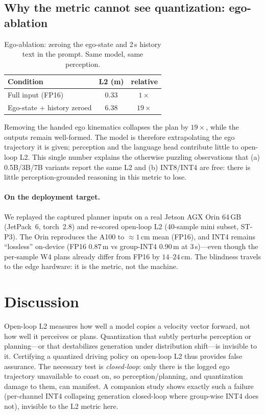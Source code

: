 \documentclass[conference]{IEEEtran}
\begin{document}
\subsection{Why the metric cannot see quantization: ego-ablation}
\begin{table}[t]\centering
\caption{Ego-ablation: zeroing the ego-state and 2\,s history text in the prompt. Same model,
same perception.}
\begin{tabular}{lcc}
\toprule
Condition & L2 (m) & relative \\
\midrule
Full input (FP16)          & 0.33 & $1\times$ \\
Ego-state + history zeroed & 6.38 & $19\times$ \\
\bottomrule
\end{tabular}
\end{table}
Removing the handed ego kinematics collapses the plan by $19\times$, while the outputs remain
well-formed. The model is therefore extrapolating the ego trajectory it is given; perception and
the language head contribute little to open-loop L2. This single number explains the otherwise
puzzling observations that (a) 0.5B/3B/7B variants report the same L2 and (b) INT8/INT4 are free:
there is little perception-grounded reasoning in this metric to lose.

\paragraph{On the deployment target.} We replayed the captured planner inputs on a real Jetson AGX
Orin 64\,GB (JetPack~6, torch~2.8) and re-scored open-loop L2 (40-sample mini subset, ST-P3). The
Orin reproduces the A100 to $\approx 1$\,cm mean (FP16), and INT4 remains ``lossless'' on-device
(FP16 $0.87$\,m vs group-INT4 $0.90$\,m at 3\,s)---even though the per-sample W4 plans already differ
from FP16 by $14$--$24$\,cm. The blindness travels to the edge hardware: it is the metric, not the
machine.

\section{Discussion}
Open-loop L2 measures how well a model copies a velocity vector forward, not how well it perceives
or plans. Quantization that subtly perturbs perception or planning---or that destabilizes
generation under distribution shift---is invisible to it. Certifying a quantized driving policy on
open-loop L2 thus provides false assurance. The necessary test is \emph{closed-loop}: only there
is the logged ego trajectory unavailable to coast on, so perception/planning, and quantization
damage to them, can manifest. A companion study shows exactly such a failure (per-channel INT4
collapsing generation closed-loop where group-wise INT4 does not), invisible to the L2 metric here.
\end{document}
